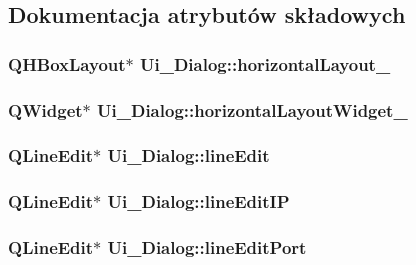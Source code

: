 \subsection{Dokumentacja atrybutów składowych}
\hypertarget{classUi__Dialog_a289b49bcdd28408efe2510f029535c2b}{
\subsubsection[{horizontal\-Layout\-\_\-2}]{\setlength{\rightskip}{0pt plus 5cm}Q\-H\-Box\-Layout$\ast$ Ui\-\_\-\-Dialog\-::horizontal\-Layout\-\_}}\label{classUi__Dialog_a289b49bcdd28408efe2510f029535c2b}
\hypertarget{classUi__Dialog_a4a01239907c0d25e55efbe5811d64e94}{
\subsubsection[{horizontal\-Layout\-Widget\-\_\-2}]{\setlength{\rightskip}{0pt plus 5cm}Q\-Widget$\ast$ Ui\-\_\-\-Dialog\-::horizontal\-Layout\-Widget\-\_}}\label{classUi__Dialog_a4a01239907c0d25e55efbe5811d64e94}
\hypertarget{classUi__Dialog_a934cf16b9b36614a93f04261c652c1c7}{
\subsubsection[{line\-Edit}]{\setlength{\rightskip}{0pt plus 5cm}Q\-Line\-Edit$\ast$ Ui\-\_\-\-Dialog\-::line\-Edit}}\label{classUi__Dialog_a934cf16b9b36614a93f04261c652c1c7}
\hypertarget{classUi__Dialog_ab46d172e983ee875ea7d404f0e9cffeb}{
\subsubsection[{line\-Edit\-I\-P}]{\setlength{\rightskip}{0pt plus 5cm}Q\-Line\-Edit$\ast$ Ui\-\_\-\-Dialog\-::line\-Edit\-I\-P}}\label{classUi__Dialog_ab46d172e983ee875ea7d404f0e9cffeb}
\hypertarget{classUi__Dialog_af72591b169533ffca5bfb1aef6771696}{
\subsubsection[{line\-Edit\-Port}]{\setlength{\rightskip}{0pt plus 5cm}Q\-Line\-Edit$\ast$ Ui\-\_\-\-Dialog\-::line\-Edit\-Port}}\label{classUi__Dialog_af72591b169533ffca5bfb1aef6771696}
